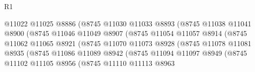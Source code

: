 \begin{lexlean}{R1}
\begin{coremodule}
                                      @11022
                                      @11025
                                      @8886
                                      (@8745
                                        @11030
                                        @11033
                                        @8893
                                        (@8745
                                          @11038
                                          @11041
                                          @8900
                                          (@8745
                                            @11046
                                            @11049
                                            @8907
                                            (@8745
                                              @11054
                                              @11057
                                              @8914
                                              (@8745
                                                @11062
                                                @11065
                                                @8921
                                                (@8745
                                                  @11070
                                                  @11073
                                                  @8928
                                                  (@8745
                                                    @11078
                                                    @11081
                                                    @8935
                                                    (@8745
                                                      @11086
                                                      @11089
                                                      @8942
                                                      (@8745
                                                        @11094
                                                        @11097
                                                        @8949
                                                        (@8745
                                                          @11102
                                                          @11105
                                                          @8956
                                                          (@8745
                                                            @11110
                                                            @11113
                                                            @8963

\end{coremodule}
\end{lexlean}
